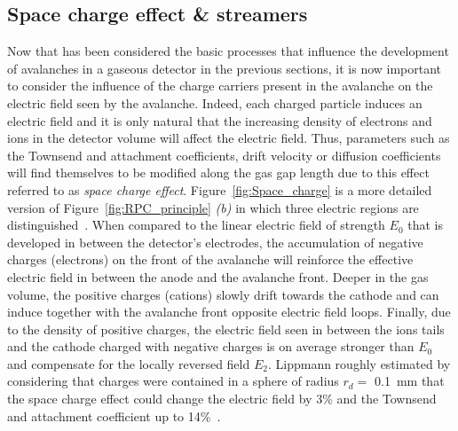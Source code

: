 	\subsection{Space charge effect \& streamers}
	\label{chapt4:ssec:space-charge}
	
	Now that has been considered the basic processes that influence the development of avalanches in a gaseous detector in the previous sections, it is now important to consider the influence of the charge carriers present in the avalanche on the electric field seen by the avalanche. Indeed, each charged particle induces an electric field and it is only natural that the increasing density of electrons and ions in the detector volume will affect the electric field. Thus, parameters such as the Townsend and attachment coefficients, drift velocity or diffusion coefficients will find themselves to be modified along the gas gap length due to this effect referred to as \textit{space charge effect}. Figure~\ref{fig:Space_charge} is a more detailed version of Figure~\ref{fig:RPC_principle} \textit{(b)} in which three electric regions are distinguished~\cite{LIPPMANN2003}. When compared to the linear electric field of strength $E_0$ that is developed in between the detector's electrodes, the accumulation of negative charges (electrons) on the front of the avalanche will reinforce the effective electric field in between the anode and the avalanche front. Deeper in the gas volume, the positive charges (cations) slowly drift towards the cathode and can induce together with the avalanche front opposite electric field loops. Finally, due to the density of positive charges, the electric field seen in between the ions tails and the cathode charged with negative charges is on average stronger than $E_0$ and compensate for the locally reversed field $E_2$. Lippmann roughly estimated by considering that  charges were contained in a sphere of radius $r_d =$ \SI{0.1}{mm} that the space charge effect could change the electric field by 3\% and the Townsend and attachment coefficient up to 14\%~\cite{LIPPMANN2003,VINCENT2017}.
	
